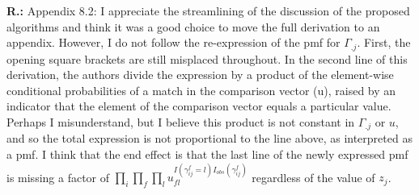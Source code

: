 \documentclass[letterpaper, parskip]{scrartcl}
\newcommand{\pointRaised}[2]{%
	\textbf{#1.\theresponsectr:} #2
}
\newcounter{responsectr}[section]     %
\newcommand{\reply}[1]{%
	\refstepcounter{responsectr}%
		\begin{tcolorbox}
			\itshape #1
		\end{tcolorbox}
}
\begin{document}
	
	
	
	


	\pointRaised{R}{%
	Appendix 8.2: I appreciate the streamlining of the discussion of the proposed algorithms and think it was a good choice to move the full derivation to an appendix. However, I do not follow the re-expression of the pmf for $\Gamma_{.j}$. First, the opening square brackets are still misplaced
	throughout. In the second line of this derivation, the authors divide the expression by a product of the element-wise conditional probabilities of a match in the comparison vector (u), raised by an indicator that the element of the comparison vector equals a particular value. Perhaps I misunderstand, but I believe this product is not constant in $\Gamma_{.j}$ or $u$, and so the total expression is not proportional to the line above, as interpreted as a pmf. I think that the end effect is that the last line of the newly expressed pmf is missing a factor of $\prod_i \prod_f \prod_l u_{fl}^{I(\gamma_{ij}^f = l) I_{obs}(\gamma_{ij}^f)}$ regardless of the value of $z_j$.}
	
\end{document}
